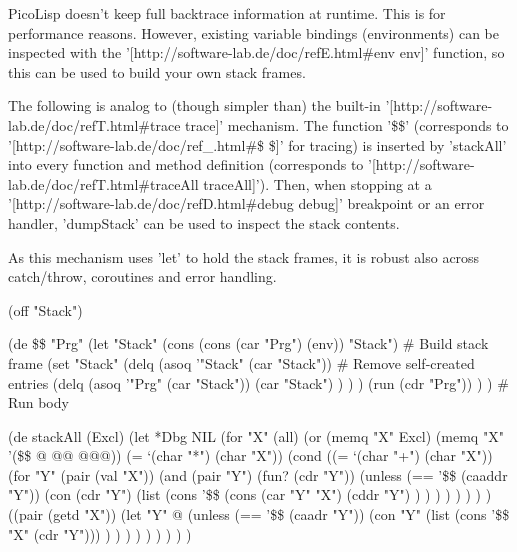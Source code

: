 \begin{wideverbatim}

PicoLisp doesn't keep full backtrace information at runtime. This is for
performance reasons. However, existing variable bindings (environments) can be
inspected with the '[http://software-lab.de/doc/refE.html#env env]' function, so
this can be used to build your own stack frames.

The following is analog to (though simpler than) the built-in
'[http://software-lab.de/doc/refT.html#trace trace]' mechanism. The function
'\$\$' (corresponds to '[http://software-lab.de/doc/ref_.html#\$ \$]' for tracing)
is inserted by 'stackAll' into every function and method definition
(corresponds to '[http://software-lab.de/doc/refT.html#traceAll traceAll]').
Then, when stopping at a '[http://software-lab.de/doc/refD.html#debug debug]'
breakpoint or an error handler, 'dumpStack' can be used to inspect the stack
contents.

As this mechanism uses 'let' to hold the stack frames, it is robust also across
catch/throw, coroutines and error handling.

(off "Stack")

(de \$\$ "Prg"
   (let "Stack" (cons (cons (car "Prg") (env)) "Stack")  # Build stack frame
      (set "Stack"
         (delq (asoq '"Stack" (car "Stack"))  # Remove self-created entries
            (delq (asoq '"Prg" (car "Stack"))
               (car "Stack") ) ) )
      (run (cdr "Prg")) ) )  # Run body


(de stackAll (Excl)
   (let *Dbg NIL
      (for "X" (all)
         (or
            (memq "X" Excl)
            (memq "X" '(\$\$ @ @@ @@@))
            (= `(char "*") (char "X"))
            (cond
               ((= `(char "+") (char "X"))
                  (for "Y" (pair (val "X"))
                     (and
                        (pair "Y")
                        (fun? (cdr "Y"))
                        (unless (== '\$\$ (caaddr "Y"))
                           (con (cdr "Y")
                              (list
                                 (cons '\$\$
                                    (cons (car "Y" "X")
                                       (cddr "Y") ) ) ) ) ) ) ) )
               ((pair (getd "X"))
                  (let "Y" @
                     (unless (== '\$\$ (caadr "Y"))
                        (con "Y"
                           (list (cons '\$\$ "X" (cdr "Y"))) ) ) ) ) ) ) ) ) )

\end{wideverbatim}

